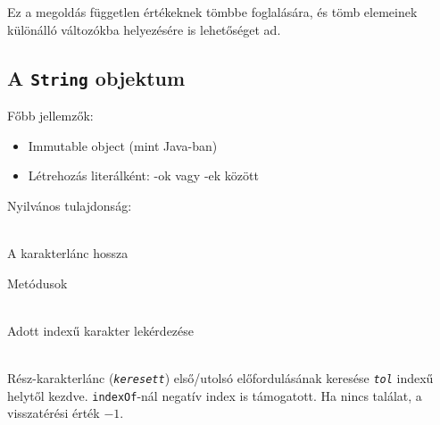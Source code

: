 \begin{frame}
  Ez a megoldás független értékeknek tömbbe foglalására, és tömb elemeinek különálló változókba helyezésére is lehetőséget ad.
  \begin{exampleblock}{}
    
  \end{exampleblock}
\end{frame}

\subsection{A \texttt{String} objektum}

\begin{frame}
  Főbb jellemzők:
  \begin{itemize}
    \item Immutable object (mint Java-ban)
    \item Létrehozás literálként: -ok vagy -ek között
  \end{itemize}
  Nyilvános tulajdonság:
  \begin{description}[m]
    \item[\texttt{length}] \hfill \\ A karakterlánc hossza
  \end{description}
  Metódusok
  \begin{description}[m]
    \item[\texttt{charAt()}, \texttt{[ ]}] \hfill \\ Adott indexű karakter lekérdezése
    \item[\texttt{indexOf(\emph{keresett}[, \emph{tol}])}, \texttt{lastIndexOf(\emph{keresett}[, \emph{tol}])}] \hfill \\ Rész-karakterlánc (\texttt{\emph{keresett}}) első/utolsó előfordulásának keresése \texttt{\emph{tol}} indexű helytől kezdve. \texttt{indexOf}-nál negatív index is támogatott. Ha nincs találat, a visszatérési érték $-1$.
  \end{description}
\end{frame}

\begin{frame}
  \begin{exampleblock}{}
    
  \end{exampleblock}
\end{frame}

